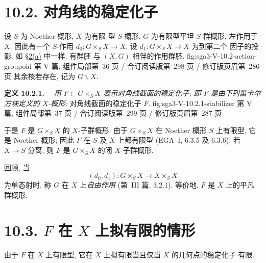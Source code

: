 \section*{10.2. 对角线的稳定化子}
\label{sec:sga3-V-10.2}

设 \(S\) 为 Noether 概形, \(X\) 为有限
型 \(S\)-概形, \(G\) 为有限型平坦 \(S\)-群概形,
左作用于 \(X\). 因此有一个 \(S\)-作用
\(d_0:G\times_SX\to X\). 设 \(d_1:G\times_SX\to X\) 为到第二个
因子的投影. 如 \hyperref[par:sga3-V-2-a]{\S2(a)} 中一样, 有群胚
  {与 \((X,G)\) 相伴的作用群胚.}
  {fig:sga3-V-10.2-action-groupoid}
  {第 V 篇, 组件局部第~36 页 / 合订阅读版第~298 页 /
   修订版页眉第~286 页}
其余核若存在, 记为 \(G\backslash X\).

\medskip
{}\label{def:sga3-V-10.2.1}%
\noindent\textbf{定义 10.2.1.}---
\textit{用 \(F\subset G\times_SX\) 表示\emph{对角线截面的稳定化子};
即 \(F\) 是由下列笛卡尔方块定义的 \(X\)-概形:}
  {对角线截面的稳定化子 \(F\).}
  {fig:sga3-V-10.2.1-stabilizer}
  {第 V 篇, 组件局部第~37 页 / 合订阅读版第~299 页 /
   修订版页眉第~287 页}

于是 \(F\) 是 \(G\times_SX\) 的 \(X\)-子群概形. 由于
\(G\times_SX\) 在 Noether 概形 \(S\) 上有限型,
它是 Noether 概形; 因此 \(F\) 在 \(S\)
及 \(X\) 上都有限型 (EGA~I, 6.3.5 及 6.3.6). 若 \(X\to S\) 分离,
则 \(F\) 是 \(G\times_SX\) 的闭 \(X\)-子群概形.

回顾, 当
\[
  (d_0,d_1):G\times_SX\longrightarrow X\times_SX
\]
为单态射时, 称 \(G\) 在 \(X\) 上\emph{自由作用}
(第~III 篇, 3.2.1). 等价地, \(F\) 是
\(X\) 上的平凡群概形.

\section*{10.3. \(F\) 在 \(X\) 上拟有限的情形}
\label{sec:sga3-V-10.3}

由于 \(F\) 在 \(X\) 上有限型, 它在
\(X\) 上拟有限当且仅当 \(X\) 的几何点的稳定化子
有限.

